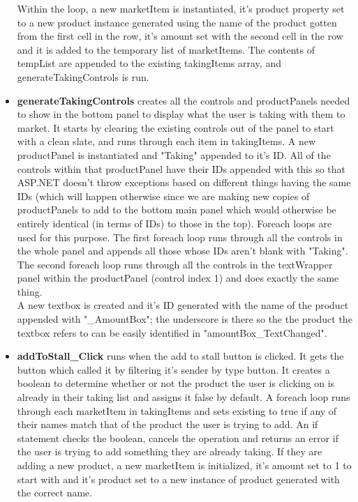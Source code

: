 ﻿\documentclass{article}
\begin{document}
\begin{itemize}
        Within the loop, a new marketItem is instantiated, it's product property set to a new product instance generated using the name of the product gotten from the first cell in the row, it's amount set with the second cell in the row and it is added to the temporary list of marketItems.
        The contents of tempList are appended to the existing takingItems array, and generateTakingControls is run.
        \item \textbf{generateTakingControls} creates all the controls and productPanels needed to show in the bottom panel to display what the user is taking with them to market.
        It starts by clearing the existing controls out of the panel to start with a clean slate, and runs through each item in takingItems.
        A new productPanel is instantiated and "Taking" appended to it's ID.
        All of the controls within that productPanel have their IDs appended with this so that ASP.NET doesn't throw exceptions based on different things having the same IDs (which will happen otherwise since we are making new copies of productPanels to add to the bottom main panel which would otherwise be entirely identical (in terms of IDs) to those in the top).
        Foreach loops are used for this purpose.
        The first foreach loop runs through all the controls in the whole panel and appends all those whose IDs aren't blank with "Taking".
        The second foreach loop runs through all the controls in the textWrapper panel within the productPanel (control index 1) and does exactly the same thing.
        \\
        A new textbox is created and it's ID generated with the name of the product appended with "\_AmountBox"; the underscore is there so the the product the textbox refers to can be easily identified in "amountBox\_TextChanged".
        \item \textbf{addToStall\_Click} runs when the add to stall button is clicked.
        It gets the button which called it by filtering it's sender by type button.
        It creates a boolean to determine whether or not the product the user is clicking on is already in their taking list and assigns it false by default.
        A foreach loop runs through each marketItem in takingItems and sets existing to true if any of their names match that of the product the user is trying to add.
        An if statement checks the boolean, cancels the operation and returns an error if the user is trying to add something they are already taking.
        If they are adding a new product, a new marketItem is initialized, it's amount set to 1 to start with and it's product set to a new instance of product generated with the correct name.

\end{itemize}
\end{document}
